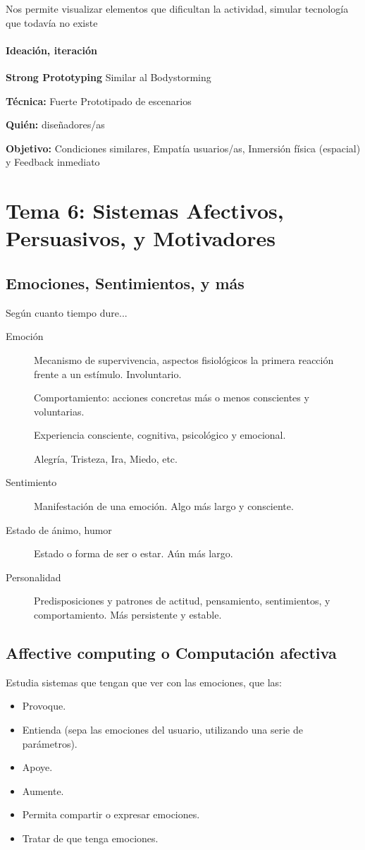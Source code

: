 \documentclass[12pt, twoside, openright]{report} %
\begin{document}
Nos permite visualizar elementos que dificultan la actividad, simular tecnología que todavía no existe

\subsubsection{Ideación, iteración}
\textbf{Strong Prototyping} Similar al Bodystorming

\textbf{Técnica:} Fuerte Prototipado de escenarios

\textbf{Quién:} diseñadores/as

\textbf{Objetivo:} Condiciones similares, Empatía usuarios/as, Inmersión física (espacial) y Feedback inmediato


\chapter{Tema 6: Sistemas Afectivos, Persuasivos, y Motivadores}

\section{Emociones, Sentimientos, y más}
Según cuanto tiempo dure...
\begin{description}
  \item[Emoción] Mecanismo de supervivencia, aspectos fisiológicos la primera reacción frente a un estímulo. Involuntario.
  
  Comportamiento: acciones concretas más o menos conscientes y voluntarias.

  Experiencia consciente, cognitiva, psicológico y emocional.

  Alegría, Tristeza, Ira, Miedo, etc. 
  \item[Sentimiento] Manifestación de una emoción. Algo más largo y consciente.
  \item[Estado de ánimo, humor] Estado o forma de ser o estar. Aún más largo.
  \item[Personalidad] Predisposiciones y patrones de actitud, pensamiento, sentimientos, y comportamiento. Más persistente y estable.
\end{description}
  

\section{Affective computing o Computación afectiva}
Estudia sistemas que tengan que ver con las emociones, que las:
\begin{itemize}
  \item Provoque.
  \item Entienda (sepa las emociones del usuario, utilizando una serie de parámetros).
  \item Apoye.
  \item Aumente.
  \item Permita compartir o expresar emociones.
  \item Tratar de que tenga emociones.
\end{itemize}
\end{document}
